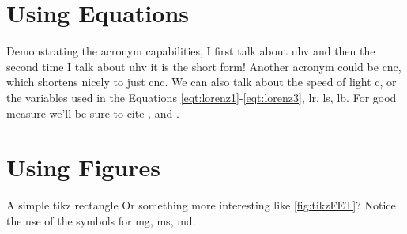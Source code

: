 \documentclass[hidelinks]{report}
\begin{document}
{}
    \section{Using Equations}
        Demonstrating the acronym capabilities, I first talk about \gls{uhv} and then the second time I talk about \gls{uhv} it is the short form!
        Another acronym could be \gls{cnc}, which shortens nicely to just \gls{cnc}.
        We can also talk about the speed of light \gls{c}, or the variables used in the Equations \ref{eqt:lorenz1}-\ref{eqt:lorenz3}, \gls{lr}, \gls{ls}, \gls{lb}.
        For good measure we'll be sure to cite \cite{Bello_2017}, and \cite{Knuth_2022}.
    \section{Using Figures}
        A simple tikz rectangle
        Or something more interesting like \ref{fig:tikzFET}? Notice the use of the symbols for \gls{mg}, \gls{ms}, \gls{md}.

    \standaloneBib
\end{document}
